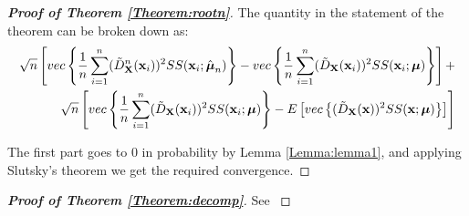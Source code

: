 \documentclass[fleqn,12pt]{article}
\begin{document}
\begin{proof}[\textbf{Proof of Theorem \ref{Theorem:rootn}}]
The quantity in the statement of the theorem can be broken down as:
\begin{eqnarray*}
\sqrt n \left[ vec\left\{ \frac{1}{n} \sum_{i=1}^n (\tilde D^n_{\mathbf{X}} ({\bf{x}}_i))^2 SS({\bf{x}}_i; \hat{{\boldsymbol{\mu}}}_n) \right\} - vec\left\{ \frac{1}{n} \sum_{i=1}^n (\tilde D_{\mathbf{X}} ({\bf{x}}_i))^2 SS({\bf{x}}_i; {\boldsymbol{\mu}}) \right\} \right] +\\
\sqrt n \left[ vec\left\{ \frac{1}{n} \sum_{i=1}^n (\tilde D_{\mathbf{X}} ({\bf{x}}_i))^2 SS({\bf{x}}_i; {\boldsymbol{\mu}}) \right\} - E \left[ vec\left\{ (\tilde D_{\mathbf{X}} ({\bf{x}}))^2 SS({\bf{x}}; {\boldsymbol{\mu}}) \right\} \right] \right]
\end{eqnarray*}

The first part goes to 0 in probability by Lemma \ref{Lemma:lemma1}, and applying Slutsky's theorem we get the required convergence.
\end{proof}

\begin{proof}[\textbf{Proof of Theorem \ref{Theorem:decomp}}]
See \cite{taskinen12}
\end{proof}
\end{document}
